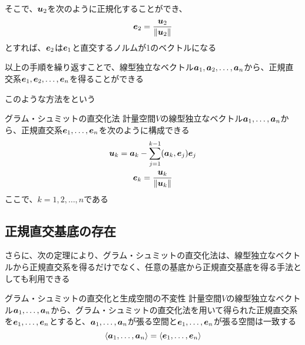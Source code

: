 \documentclass[../../../topic_linear-algebra]{subfiles}
\begin{document}
\br

そこで、$\vb*{u}_2$を次のように正規化することができ、
\begin{equation*}
  \vb*{e}_2 = \frac{\vb*{u}_2}{\|\vb*{u}_2\|}
\end{equation*}
とすれば、$\vb*{e}_2$は$\vb*{e}_1$と直交するノルムが1のベクトルになる

\sectionline

以上の手順を繰り返すことで、線型独立なベクトル$\vb*{a}_1, \vb*{a}_2, \ldots, \vb*{a}_n$から、正規直交系$\vb*{e}_1, \vb*{e}_2, \ldots, \vb*{e}_n$を得ることができる

\br

このような方法をという

\begin{theorem}{グラム・シュミットの直交化法}
  計量空間$V$の線型独立なベクトル$\vb*{a}_1, \ldots, \vb*{a}_n$から、正規直交系$\vb*{e}_1, \ldots, \vb*{e}_n$を次のように構成できる
  \begin{gather*}
    \vb*{u}_k = \vb*{a}_k - \sum_{j=1}^{k-1} (\vb*{a}_k, \vb*{e}_j) \vb*{e}_j \\
    \vb*{e}_k = \frac{\vb*{u}_k}{\|\vb*{u}_k\|}
  \end{gather*}
  ここで、$k = 1, 2, \ldots, n$である
\end{theorem}

\subsection{正規直交基底の存在}

さらに、次の定理により、グラム・シュミットの直交化法は、線型独立なベクトルから正規直交系を得るだけでなく、任意の基底から正規直交基底を得る手法としても利用できる

\begin{theorem}{グラム・シュミットの直交化と生成空間の不変性}
  計量空間$V$の線型独立なベクトル$\vb*{a}_1, \ldots, \vb*{a}_n$から、グラム・シュミットの直交化法を用いて得られた正規直交系を$\vb*{e}_1, \ldots, \vb*{e}_n$とすると、$\vb*{a}_1,\ldots,\vb*{a}_n$が張る空間と$\vb*{e}_1,\ldots,\vb*{e}_n$が張る空間は一致する
  \begin{equation*}
    \langle \vb*{a}_1, \ldots, \vb*{a}_n \rangle = \langle \vb*{e}_1, \ldots, \vb*{e}_n \rangle
  \end{equation*}
\end{theorem}
\end{document}

